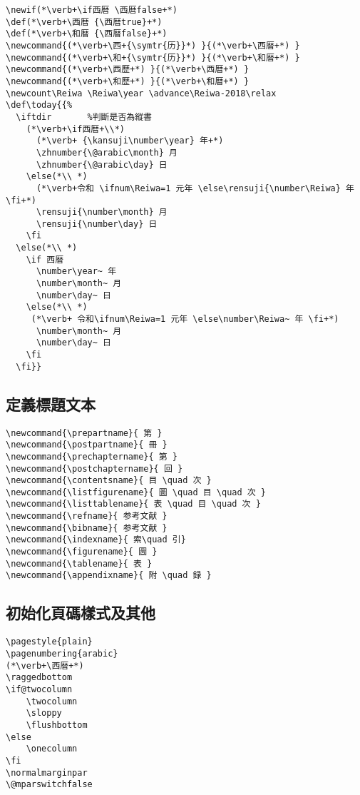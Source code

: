 \begin{lstlisting}[firstnumber=1459]
\newif(*\verb+\if西暦 \西暦false+*)
\def(*\verb+\西暦 {\西暦true}+*)
\def(*\verb+\和暦 {\西暦false}+*)
\newcommand{(*\verb+\西+{\symtr{历}}*) }{(*\verb+\西暦+*) }
\newcommand{(*\verb+\和+{\symtr{历}}*) }{(*\verb+\和暦+*) }
\newcommand{(*\verb+\西歷+*) }{(*\verb+\西暦+*) }
\newcommand{(*\verb+\和歷+*) }{(*\verb+\和暦+*) }
\newcount\Reiwa \Reiwa\year \advance\Reiwa-2018\relax
\def\today{{%
  \iftdir		%判斷是否為縱書
    (*\verb+\if西暦+\\*)
      (*\verb+ {\kansuji\number\year} 年+*)
      \zhnumber{\@arabic\month} 月
      \zhnumber{\@arabic\day} 日
    \else(*\\ *)
      (*\verb+令和 \ifnum\Reiwa=1 元年 \else\rensuji{\number\Reiwa} 年 \fi+*)
      \rensuji{\number\month} 月
      \rensuji{\number\day} 日
    \fi
  \else(*\\ *)
    \if 西暦
      \number\year~ 年
      \number\month~ 月
      \number\day~ 日
    \else(*\\ *)
     (*\verb+ 令和\ifnum\Reiwa=1 元年 \else\number\Reiwa~ 年 \fi+*)
      \number\month~ 月
      \number\day~ 日
    \fi
  \fi}}
\end{lstlisting}

\subsection{定義標題文本}

\begin{lstlisting}[firstnumber=1491]
\newcommand{\prepartname}{ 第 }
\newcommand{\postpartname}{ 冊 }
\newcommand{\prechaptername}{ 第 }
\newcommand{\postchaptername}{ 回 }
\newcommand{\contentsname}{ 目 \quad 次 }
\newcommand{\listfigurename}{ 圖 \quad 目 \quad 次 }
\newcommand{\listtablename}{ 表 \quad 目 \quad 次 }
\newcommand{\refname}{ 参考文献 }
\newcommand{\bibname}{ 参考文献 }
\newcommand{\indexname}{ 索\quad 引}
\newcommand{\figurename}{ 圖 }
\newcommand{\tablename}{ 表 }
\newcommand{\appendixname}{ 附 \quad 録 }
\end{lstlisting}

\subsection{初始化頁碼樣式及其他}

\begin{lstlisting}[firstnumber=1501]
\pagestyle{plain}
\pagenumbering{arabic}
(*\verb+\西暦+*)
\raggedbottom
\if@twocolumn
	\twocolumn
	\sloppy
	\flushbottom
\else
	\onecolumn
\fi
\normalmarginpar
\@mparswitchfalse
\end{lstlisting}

